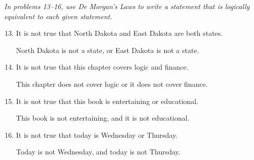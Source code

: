 \emph{In problems 13--16, use De Morgan's Laws to write a statement that is logically equivalent to each given statement.}
\begin{enumerate}
\setcounter{enumi}{12}

\item It is not true that North Dakota and East Dakota are both states. \\ 
\begin{framed}
North Dakota is not a state, or East Dakota is not a state.
\end{framed}

\item It is not true that this chapter covers logic and finance. \\ 
\begin{framed}
This chapter does not cover logic or it does not cover finance.
\end{framed}

\item It is not true that this book is entertaining or educational. \\ 
\begin{framed}
This book is not entertaining, and it is not educational.
\end{framed}

\item It is not true that today is Wednesday or Thursday. \\ 
\begin{framed}
Today is not Wednesday, and today is not Thursday.
\end{framed}
\end{enumerate}

